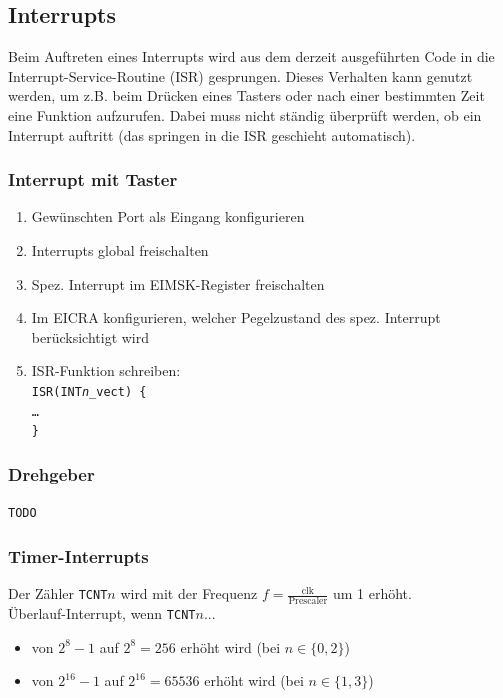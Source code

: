 \documentclass[german]{latex4ei/latex4ei_sheet}
\begin{document}
\begin{minipage}{\columnwidth}
\subsection{Interrupts}
Beim Auftreten eines Interrupts wird aus dem derzeit ausgeführten Code in die Interrupt-Service-Routine (ISR) gesprungen. Dieses Verhalten kann genutzt werden, um z.B. beim Drücken eines Tasters oder nach einer bestimmten Zeit eine Funktion aufzurufen. Dabei muss nicht ständig überprüft werden, ob ein Interrupt auftritt (das springen in die ISR geschieht automatisch).
\end{minipage}
\subsubsection{Interrupt mit Taster}
\begin{enumerate}
\item Gewünschten Port als Eingang konfigurieren
\item Interrupts global freischalten
\item Spez. Interrupt im EIMSK-Register freischalten
\item Im EICRA konfigurieren, welcher Pegelzustand des spez. Interrupt berücksichtigt wird
\item ISR-Funktion schreiben: \\
\texttt{ISR(INT\textit{n}\_vect) \{ \\ \dots \\ \} }
\end{enumerate}
\subsubsection{Drehgeber}
\texttt{TODO}
\subsubsection{Timer-Interrupts}
Der Zähler \texttt{TCNT$n$} wird mit der Frequenz $f=\frac{\text{clk}}{\text{Prescaler}}$ um 1 erhöht. \\
Überlauf-Interrupt, wenn \texttt{TCNT$n$}...
\begin{itemize}
\item von $2^8-1$ auf $2^8=256$ erhöht wird (bei $n\in \{0,2\}$)
\item von $2^{16}-1$ auf $2^{16}=65536$ erhöht wird (bei $n\in \{1,3\}$)
\end{itemize}

\newpage
\fancyhf{} %

%

\label{LastPage}
\end{document}
